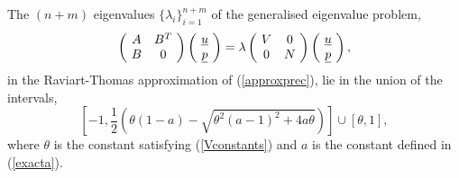 \documentclass{imamci}
\numberwithin{equation}{section}
\begin{document}
\begin{theorem}\label{bigresult}
The $(n+m)$ eigenvalues $\{\lambda_{i}\}_{i=1}^{n+m}$ of the generalised
eigenvalue problem,
\begin{equation}\label{approxprec} 
\left( \begin{array}{@{\ }cc@{\ }}
\mathnormal{A} & \mathnormal{B}^{T} \\
\mathnormal{B} & 0
\end{array} \right) \left( \begin{array}{@{\ }c@{\ }} 
 \underline{u} \\
 \underline{p} 
\end{array} \right) = \lambda\left(\begin{array}{@{\ }cc@{\ }}
 \mathnormal{V}& 0 \\
 0 & \mathnormal{N} 
 \end{array}\right) \left(\begin{array}{@{\ }c@{\ }} 
 \underline{u} \\ 
 \underline{p}
\end{array}\right),
\end{equation}
in the Raviart-Thomas approximation of (\ref{approxprec}), lie in the union of the
intervals, 
\begin{equation}\label{bigsimple} 
\left[ -1,\frac{1}{2}\left(\theta\left(1-a\right)-\sqrt{\theta^{2}\left(a
-1\right)^{2}+4a\theta}\right) \right] \cup  [\theta, 1], 
\end{equation}
where $\theta$ is the constant satisfying (\ref{Vconstants}) and $a$ is the
constant defined in (\ref{exacta}).
\end{theorem}
%
%
\end{document}
